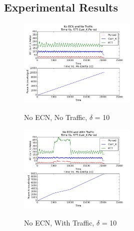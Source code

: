 \subsection{Experimental Results}
\label{sec:exp_results}


\begin{figure}[htb]
  \begin{center}

    \includegraphics[width=0.50\textwidth]{Figures/iccps2014/no_ecn_no_tr_d10.png}
  \caption{No ECN, No Traffic, $\delta$ = 10}
  \label{fig:no_ecn_no_tr_d10}
    \includegraphics[width=0.50\textwidth]{Figures/iccps2014/no_ecn_w_tr_d10.png}
  \caption{No ECN, With Traffic, $\delta$ = 10}
  \label{fig:no_ecn_w_tr_d10}

  \end{center}
\end{figure}
